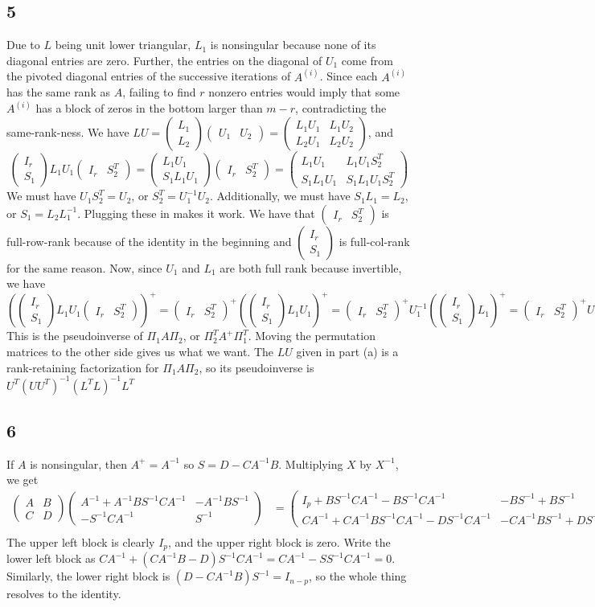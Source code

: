 \documentclass{article}
\newcommand{\openm}{\begin{pmatrix}}
\newcommand{\closem}{\end{pmatrix}}
\begin{document}
\subsection*{5}
Due to $L$ being unit lower triangular, $L_1$ is nonsingular because none of its diagonal entries are zero. Further, the entries on the diagonal of $U_1$ come from the pivoted diagonal entries of the successive iterations of $A^{(i)}$. Since each $A^{(i)}$ has the same rank as $A$, failing to find $r$ nonzero entries would imply that some $A^{(i)}$ has a block of zeros in the bottom larger than $m-r$, contradicting the same-rank-ness.
We have $LU=\openm L_1\\L_2\closem\openm U_1&U_2\closem=\openm L_1U_1&L_1U_2\\L_2U_1&L_2U_2\closem$, and
\[\openm I_r\\S_1\closem L_1U_1\openm I_r&S_2^T\closem=\openm L_1U_1\\S_1L_1U_1\closem\openm I_r&S_2^T\closem=\openm L_1U_1&L_1U_1S_2^T\\S_1L_1U_1&S_1L_1U_1S_2^T\closem\]
We must have $U_1S_2^T=U_2$, or $S_2^T=U_1^{-1}U_2$. Additionally, we must have $S_1L_1=L_2$, or $S_1=L_2L_1^{-1}$. Plugging these in makes it work.
We have that $\openm I_r&S_2^T\closem$ is full-row-rank because of the identity in the beginning and $\openm I_r\\S_1\closem$ is full-col-rank for the same reason. Now, since $U_1$ and $L_1$ are both full rank because invertible, we have 
\[\left(\openm I_r\\S_1\closem L_1U_1\openm I_r&S_2^T\closem\right)^+=\openm I_r&S_2^T\closem^+\left(\openm I_r\\S_1\closem L_1U_1\right)^+=\openm I_r&S_2^T\closem^+U_1^{-1}\left(\openm I_r\\S_1\closem L_1\right)^+=\openm I_r&S_2^T\closem^+U_1^{-1}L_1^{-1}\openm I_r\\S_1\closem^+\]
This is the pseudoinverse of $\Pi_1A\Pi_2$, or $\Pi_2^TA^+\Pi_1^T$. Moving the permutation matrices to the other side gives us what we want.
The $LU$ given in part (a) is a rank-retaining factorization for $\Pi_1A\Pi_2$, so its pseudoinverse is $U^T(UU^T)^{-1}(L^TL)^{-1}L^T$
\subsection*{6}
If $A$ is nonsingular, then $A^+=A^{-1}$ so $S=D-CA^{-1}B$. Multiplying $X$ by $X^{-1}$, we get
\begin{align*}
    \openm A&B\\C&D\closem\openm A^{-1}+A^{-1}BS^{-1}CA^{-1}&-A^{-1}BS^{-1}\\-S^{-1}CA^{-1}&S^{-1}\closem&=\openm I_p+BS^{-1}CA^{-1}-BS^{-1}CA^{-1}&-BS^{-1}+BS^{-1}\\CA^{-1}+CA^{-1}BS^{-1}CA^{-1}-DS^{-1}CA^{-1}&-CA^{-1}BS^{-1}+DS^{-1}\closem\\
\end{align*}
The upper left block is clearly $I_p$, and the upper right block is zero. Write the lower left block as $CA^{-1}+(CA^{-1}B-D)S^{-1}CA^{-1}=CA^{-1}-SS^{-1}CA^{-1}=0$. Similarly, the lower right block is $(D-CA^{-1}B)S^{-1}=I_{n-p}$, so the whole thing resolves to the identity.
\end{document}

